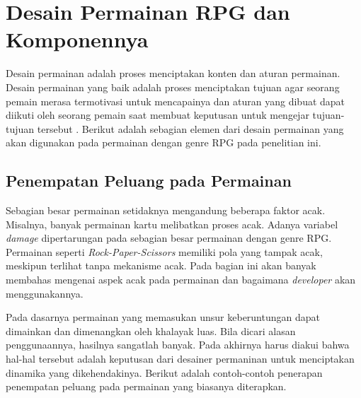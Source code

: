\section{Desain Permainan RPG dan Komponennya}
\label{sec:sec2_gdd}
\vspace{1ex}

Desain permainan adalah proses menciptakan konten dan aturan permainan. Desain permainan yang baik adalah proses menciptakan tujuan agar seorang pemain merasa termotivasi untuk mencapainya dan aturan yang dibuat dapat diikuti oleh seorang pemain saat membuat keputusan untuk mengejar tujuan-tujuan tersebut \citep{Brathwaite2009}. Berikut adalah sebagian elemen dari desain permainan yang akan digunakan pada permainan dengan genre RPG pada penelitian ini.
\vspace{1ex}

\subsection{Penempatan Peluang pada Permainan}
\label{sec:sub_sec2_kesempatan}
\vspace{1ex}

Sebagian besar permainan setidaknya mengandung beberapa faktor acak. Misalnya, banyak permainan kartu melibatkan proses acak. Adanya variabel \textit{damage} dipertarungan pada sebagian besar permainan dengan genre RPG. Permainan seperti \textit{Rock-Paper-Scissors} memiliki pola yang tampak acak, meskipun terlihat tanpa mekanisme acak. Pada bagian ini akan banyak membahas mengenai aspek acak pada permainan dan bagaimana \textit{developer} akan menggunakannya.
\vspace{1ex}

Pada dasarnya permainan yang memasukan unsur keberuntungan dapat dimainkan dan dimenangkan oleh khalayak luas. Bila dicari alasan penggunaannya, hasilnya sangatlah banyak. Pada akhirnya harus diakui bahwa hal-hal tersebut adalah keputusan dari desainer permaninan untuk menciptakan dinamika yang dikehendakinya. Berikut adalah contoh-contoh penerapan penempatan peluang pada permainan yang biasanya diterapkan.
\vspace{1ex}

